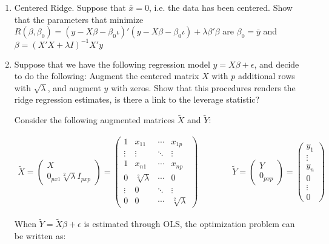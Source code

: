 \documentclass[12pt]{article}
\begin{document}
\begin{enumerate}
\begin{enumerate}
\end{enumerate}

  \item Centered Ridge. Suppose that $\bar x= 0$, i.e. the data has been centered. Show that the parameters that minimize $R(\beta,\beta_0) = (y-X\beta-\beta_0 \iota)'(y-X\beta-\beta_0 \iota)+ \lambda\beta'\beta$ are $\beta_0=\bar y$ and $\beta=(X'X+\lambda I)^{-1}X'y$

  \item Suppose that we have the following regression model  $y=X\beta +\epsilon$, and decide to do the following: Augment the centered matrix $X$ with $p$ additional rows with $\sqrt{\lambda}$, and augment $y$ with zeros. Show that this procedures renders the ridge regression estimates, is there a link to the leverage statistic?

Consider the following augmented matrices $\tilde{X}$ and $\tilde{Y}$:

\begin{align*}
    \tilde{X} =
    \left(\begin{array}{c}
        X \\
        0_{px1} \sqrt[2]{\lambda} I_{pxp} \end{array}\right) = \left(\begin{array}{cccc}
        1 & x_{11} & \cdots & x_{1p} \\
        \vdots & \vdots & \ddots  & \vdots\\
       1 & x_{n 1} & \cdots & x_{n p}\\ 0 &   \sqrt[2]{\lambda} & \cdots & 0\\
       \vdots & 0 & \ddots & \vdots \\ 0 & 0 & \cdots & \sqrt[2]{\lambda}
       \end{array}\right)
    \qquad \qquad
    \tilde{Y} =
    \left(\begin{array}{c}
     Y \\
    0_{pxp} \end{array}\right) = \left(\begin{array}{c}
        y_1\\
        \vdots\\
        y_n\\
        0\\
        \vdots\\
        0
       \end{array}\right)
\end{align*}

When $\tilde{Y} = \tilde{X} \beta + \epsilon$ is estimated through OLS, the optimization problem can be written as: 


\end{enumerate}
\end{document}
